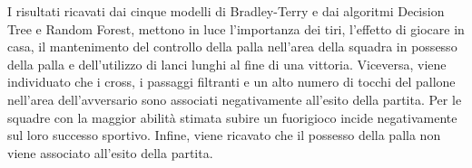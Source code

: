 \begin{comment}
	L'analisi, attraverso strumenti grafici, inizia con lo studio dei dati individuando le possibili relazioni tra l'esito della partita e le singole 29 variabili esplicative, e le possibili interazioni tra covariate. Successivamente ad alcune operazioni di \emph{prepocessing}, l'analisi è continuata con la modellazione dei modelli Bradley-Terry. La modellazione parte con il modello Bradley-Terry standard per stimare l'abilità delle singole squadre e l'effetto di giocare in casa per poi spingersi sempre più in profondità, introducendo 26 variabili esplicative fino a analizzarne il loro effetto sulle partite per ogni singola squadra. Successivamente, per verificare che l'uso dei dati è stato svolto correttamente, si è svolto l'attività di predizione con i modelli confrontando le loro predizioni con le predizioni fatte dai \emph{bookmakers}. Per rendere il lavoro di tesi più completo e approfondito, l'analisi è passata allo studio delle predizioni fatte da metodi di apprendimento automatico ovvero, il K-Nearest-Neighbors (K-NN), la Support Vector Machine (SVM), il Decision Tree, la Random Forest e l'AdaBoost. Dopo un breve confronto tra i vari metodi di \emph{machine learning} dal punto di vista delle prestazioni registrate durante la fase di predizione, i metodi di apprendimento automatico sono stati utilizzati come riferimento dal punto di vista dell'accuratezza, della precisione, della sensibilità e della specificità, per valutare la bontà dei modelli BT in fase di predizione. Successivamente, l'analisi prosegue confrontando i metodi Decision Tree e Random Forest con i modelli BT, sull'identificazione delle statistiche che influenzano l'esito di una partita. Infine, per un maggior approfondimento, è stato riapplicato il modello BT con covariate specifiche per ogni partita e per ogni squadra, estendendo la variabile risposta da tre a cinque categorie, ottenendo un risultato più raffinato ma in linea con quanto ricavato precedentemente.\\
\end{comment}
I risultati ricavati dai cinque modelli di Bradley-Terry e dai algoritmi Decision Tree e Random Forest, mettono in luce l'importanza dei tiri, l'effetto di giocare in casa, il mantenimento del controllo della palla nell'area della squadra in possesso della palla e dell'utilizzo di lanci lunghi al fine di una vittoria. Viceversa, viene individuato che i cross, i passaggi filtranti e un alto numero di tocchi del pallone nell'area dell’avversario sono associati negativamente all'esito della partita. Per le squadre con la maggior abilità stimata subire un fuorigioco incide negativamente sul loro successo sportivo. Infine, viene ricavato che il possesso della palla non viene associato all'esito della partita.\\

